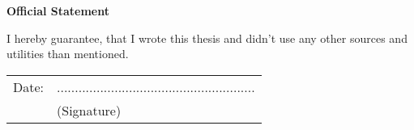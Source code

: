 \documentclass[12pt,a4paper,bibliography=totocnumbered,listof=totocnumbered]{scrartcl}
\begin{document}




\pagebreak


\pagebreak


\pagebreak


\pagebreak


\pagebreak


{}

\pagebreakd




\newpage
\thispagestyle{empty}
\begin{center}
	\vspace*{5em}
	\huge\textbf{Official Statement}\\
\end{center}
\vspace{2em}

I hereby guarantee, that I wrote this thesis and didn't use any other sources and utilities than mentioned.

\vspace{4em}
\begin{minipage}{\linewidth}
	\begin{tabular}{p{15em}p{15em}}
		Date: &  .......................................................\\
		& \centering (Signature)\\
	\end{tabular}
\end{minipage}
\end{document}
